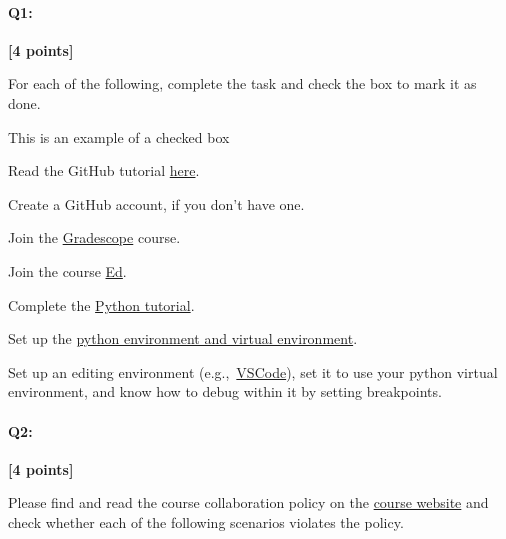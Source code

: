 \documentclass[11pt]{article}
\newcommand{\cmark}{\ding{51}}%
\newcommand{\done}{\rlap{$\square$}{\raisebox{2pt}{\large\hspace{1pt}\cmark}}%
\hspace{-2.5pt}}
\begin{document}
\pagebreak


\paragraph{Q1:} \textbf{[4 points]}
\begin{tcolorbox}[colback=orange!5!white,colframe=orange!75!black]
For each of the following, complete the task and check the box to mark it as done.
\end{tcolorbox}


\begin{tcolorbox}[colback=white!5!white,colframe=green!75!black]

\begin{todolist}
    \item[\done] This is an example of a checked box
    \item Read the GitHub tutorial \href{https://browncsci1430.github.io/webpage/resources/github_guide/}{here}.
    \item Create a GitHub account, if you don't have one.
    \item Join the \href{https://www.gradescope.com/}{Gradescope} course.
    \item Join the course \href{https://edstem.org/}{Ed}.
    \item Complete the \href{https://browncsci1430.github.io/webpage/resources/python_tutorial/}{Python tutorial}.
    \item Set up the \href{https://browncsci1430.github.io/webpage/resources/python_setup/}{python environment and virtual environment}.
    \item Set up an editing environment (e.g.,~\href{https://browncsci1430.github.io/webpage/resources/vscode_setup/}{VSCode}), set it to use your python virtual environment, and know how to debug within it by setting breakpoints.
\end{todolist}
\end{tcolorbox}

\pagebreak

\paragraph{Q2:} 
\textbf{[4 points]}
\begin{tcolorbox}[colback=orange!5!white,colframe=orange!75!black]
Please find and read the course collaboration policy on the \href{https://browncsci1430.github.io/webpage/}{course website} and check whether each of the following scenarios violates the policy.
\end{tcolorbox}
\end{document}
